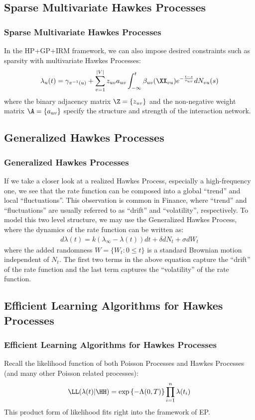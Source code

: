\documentclass{beamer}
\begin{document}
\subsection{Sparse Multivariate Hawkes Processes}
\begin{frame}
\frametitle{Sparse Multivariate Hawkes Processes}
In the HP+GP+IRM framework, we can also impose desired constraints such as sparsity with multivariate Hawkes Processes:
\begin{align}
\lambda_u(t) = \gamma_{\pi^{-1}(u)} + \sum_{v=1}^{|V|} z_{uv} a_{uv} \int_{-\infty}^t \beta_{uv}(\XX_{vu}) e^{-\frac{t-s}{\tau_{uv}}} dN_{vu}(s)
\end{align}
where the binary adjacency matrix $\Z = \{z_{uv}\}$ and the non-negative weight matrix $\A = \{a_{uv}\}$ specify the structure and strength of the interaction network.
\end{frame}

\subsection{Generalized Hawkes Processes}
\begin{frame}
\frametitle{Generalized Hawkes Processes}
If we take a closer look at a realized Hawkes Process, especially a high-frequency one, we see that the rate function can be composed into a global ``trend'' and local ``fluctuations''. This observation is common in Finance, where ``trend'' and ``fluctuations'' are usually referred to as ``drift'' and ``volatility'', respectively. To model this two level structure, we may use the Generalized Hawkes Process, where the dynamics of the rate function can be written as:
\begin{align}
	d \lambda(t) = k(\lambda_{\infty}-\lambda(t)) dt + \delta dN_t + \sigma dW_t
\end{align}
where the added randomness $W = \{W_t: 0 \le t\}$ is a standard Brownian motion independent of $N_t$. The first two terms in the above equation capture the ``drift'' of the rate function and the last term captures the ``volatility'' of the rate function.
\end{frame}


\subsection{Efficient Learning Algorithms for Hawkes Processes}
\begin{frame}
\frametitle{Efficient Learning Algorithms for Hawkes Processes}
Recall the likelihood function of both Poisson Processes and Hawkes Processes (and many other Poisson related processes):
\begin{align}
  \LL(\lambda(t)|\HH) = \exp\left\{-\Lambda(0,T)\right\} \prod_{i=1}^n \lambda(t_i) \label{like}
\end{align}
This product form of likelihood fits right into the framework of EP.
\end{frame}
\end{document}
